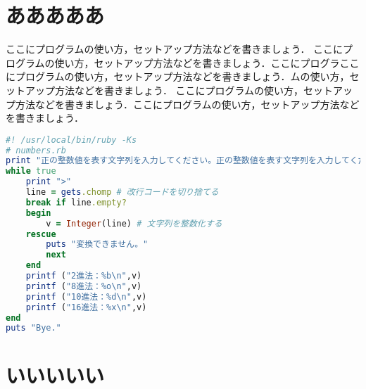 
\appendix %
\chapter{あああああ}
ここにプログラムの使い方，セットアップ方法などを書きましょう．
ここにプログラムの使い方，セットアップ方法などを書きましょう．ここにプログラここにプログラムの使い方，セットアップ方法などを書きましょう．ムの使い方，セットアップ方法などを書きましょう．
ここにプログラムの使い方，セットアップ方法などを書きましょう．ここにプログラムの使い方，セットアップ方法などを書きましょう．



\begin{lstlisting}[language=ruby,caption=スパゲッティソース,label=test.rb]
#! /usr/local/bin/ruby -Ks
# numbers.rb
print "正の整数値を表す文字列を入力してください。正の整数値を表す文字列を入力してください。\n"
while true
	print ">"
	line = gets.chomp # 改行コードを切り捨てる
	break if line.empty?
	begin
		v = Integer(line) # 文字列を整数化する
	rescue
		puts "変換できません。"
		next
	end
	printf ("2進法：%b\n",v)
	printf ("8進法：%o\n",v)
	printf ("10進法：%d\n",v)
	printf ("16進法：%x\n",v)
end
puts "Bye."
\end{lstlisting}
\chapter{いいいいい}
